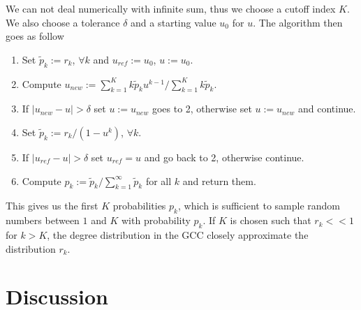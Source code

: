 \documentclass[a4paper, draft]{article}
\begin{document}
We can not deal numerically with infinite sum, thus we choose a cutoff index $K$. We also choose a tolerance $\delta$ and a starting value $u_0$ for $u$. The algorithm then goes as follow
\begin{enumerate}
	\item Set $\tilde{p}_k := r_k$, $\forall k$ and $u_{ref} := u_0$, $u := u_0$.
	\item Compute $u_{new} := \sum_{k=1}^K k \tilde{p}_k u^{k-1} / \sum_{k=1}^K k \tilde{p}_k$.
	\item If $|u_{new} - u| > \delta$ set $u := u_{new}$ goes to 2, otherwise set $u := u_{new}$ and continue.
	\item Set $\tilde{p}_k := r_k/(1 - u^k)$, $\forall k$.
	\item If $|u_{ref} - u| > \delta$ set $u_{ref} = u$ and go back to 2, otherwise continue.
	\item Compute $p_k := \tilde{p}_k / \sum_{k=1}^\infty \tilde{p}_k$ for all $k$ and return them.
\end{enumerate}

This gives us the first $K$ probabilities $p_k$, which is sufficient to sample random numbers between $1$ and $K$ with probability $p_k$. If $K$ is chosen such that $r_k << 1$ for $k > K$, the degree distribution in the GCC closely approximate the distribution $r_k$.

\begin{figure}
\end{figure}


\section{Discussion}
\end{document}
